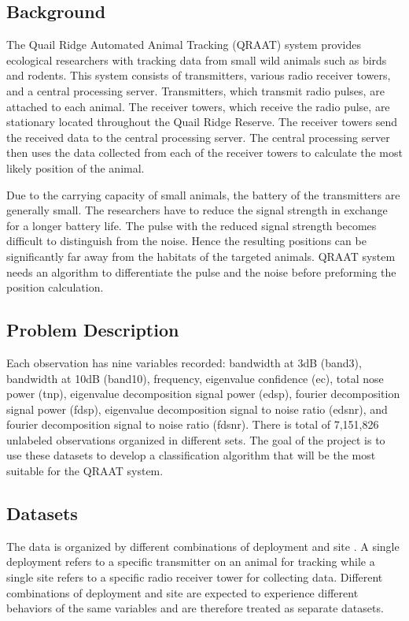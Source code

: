 \documentclass[twoside]{article}
\begin{document}
\subsection{Background}
The Quail Ridge Automated Animal Tracking (QRAAT) system provides ecological researchers with tracking data from small wild animals such as birds and rodents. This system consists of transmitters, various radio receiver towers, and a central processing server. Transmitters, which transmit radio pulses, are attached to each animal. The receiver towers, which receive the radio pulse, are stationary located throughout the Quail Ridge Reserve. The receiver towers send the received data to the central processing server. The central processing server then uses the data collected from each of the receiver towers to calculate the most likely position of the animal. 

Due to the carrying capacity of small animals, the battery of the transmitters are generally small. The researchers have to reduce the signal strength in exchange for a longer battery life. The pulse with the reduced signal strength becomes difficult to distinguish from the noise. Hence the resulting positions can be significantly far away from the habitats of the targeted animals. QRAAT system needs an algorithm to differentiate the pulse and the noise before preforming the position calculation.

\subsection{Problem Description}
Each observation has nine variables recorded: bandwidth at 3dB (band3), bandwidth at 10dB (band10), frequency, eigenvalue confidence (ec), total nose power (tnp), eigenvalue decomposition signal power (edsp), fourier decomposition signal power (fdsp), eigenvalue decomposition signal to noise ratio (edsnr), and fourier decomposition signal to noise ratio (fdsnr). There is total of 7,151,826 unlabeled observations organized in different sets. The goal of the project is to use these datasets to develop a classification algorithm that will be the most suitable for the QRAAT system. 

\subsection{Datasets}
The data is organized by different combinations of deployment and site . A single deployment refers to a specific transmitter on an animal for tracking while a single site refers to a specific radio receiver tower for collecting data. Different combinations of deployment and site are expected to experience different behaviors of the same variables and are therefore treated as separate datasets. 
\end{document}
